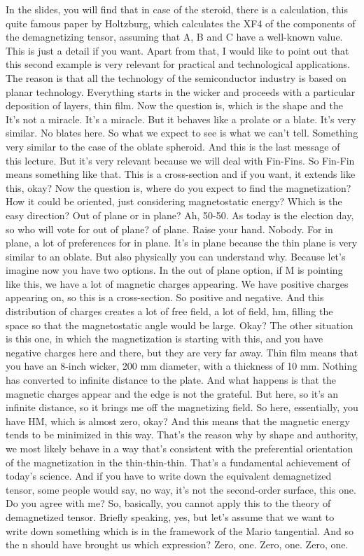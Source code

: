 In the slides, you will find that in case of the steroid, there is a calculation, this quite famous paper by Holtzburg, which calculates the XF4 of the components of the demagnetizing tensor, assuming that A, B and C have a well-known value. This is just a detail if you want. Apart from that, I would like to point out that this second example is very relevant for practical and technological applications. The reason is that all the technology of the semiconductor industry is based on planar technology. Everything starts in the wicker and proceeds with a particular deposition of layers, thin film. Now the question is, which is the shape and the It's not a miracle. It's a miracle. But it behaves like a prolate or a blate. It's very similar. No blates here. So what we expect to see is what we can't tell. Something very similar to the case of the oblate spheroid. And this is the last message of this lecture. But it's very relevant because we will deal with Fin-Fins. So Fin-Fin means something like that. This is a cross-section and if you want, it extends like this, okay? Now the question is, where do you expect to find the magnetization? How it could be oriented, just considering magnetostatic energy? Which is the easy direction? Out of plane or in plane? Ah, 50-50. As today is the election day, so who will vote for out of plane? of plane. Raise your hand. Nobody. For in plane, a lot of preferences for in plane. It's in plane because the thin plane is very similar to an oblate. But also physically you can understand why. Because let's imagine now you have two options. In the out of plane option, if M is pointing like this, we have a lot of magnetic charges appearing. We have positive charges appearing on, so this is a cross-section. So positive and negative. And this distribution of charges creates a lot of free field, a lot of field, hm, filling the space so that the magnetostatic angle would be large. Okay? The other situation is this one, in which the magnetization is starting with this, and you have negative charges here and there, but they are very far away. Thin film means that you have an 8-inch wicker, 200 mm diameter, with a thickness of 10 mm. Nothing has converted to infinite distance to the plate. And what happens is that the magnetic charges appear and the edge is not the grateful. But here, so it's an infinite distance, so it brings me off the magnetizing field. So here, essentially, you have HM, which is almost zero, okay? And this means that the magnetic energy tends to be minimized in this way. That's the reason why by shape and authority, we most likely behave in a way that's consistent with the preferential orientation of the magnetization in the thin-thin-thin. That's a fundamental achievement of today's science. And if you have to write down the equivalent demagnetized tensor, some people would say, no way, it's not the second-order surface, this one. Do you agree with me? So, basically, you cannot apply this to the theory of demagnetized tensor. Briefly speaking, yes, but let's assume that we want to write down something which is in the framework of the Mario tangential. And so the n should have brought us which expression? Zero, one. Zero, one. Zero, one.
